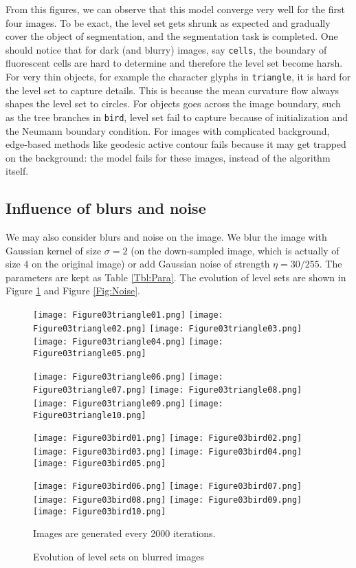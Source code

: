 \documentclass[english, nochinese]{pnote}
\begin{document}
From this figures, we can observe that this model converge very well for the first four images. To be exact, the level set gets shrunk as expected and gradually cover the object of segmentation, and the segmentation task is completed. One should notice that for dark (and blurry) images, say \verb"cells", the boundary of fluorescent cells are hard to determine and therefore the level set become harsh. For very thin objects, for example the character glyphs in \verb"triangle", it is hard for the level set to capture details. This is because the mean curvature flow always shapes the level set to circles. For objects goes across the image boundary, such as the tree branches in \verb"bird", level set fail to capture because of initialization and the Neumann boundary condition. For images with complicated background, edge-based methods like geodesic active contour fails because it may get trapped on the background: the model fails for these images, instead of the algorithm itself.

\subsection{Influence of blurs and noise}

We may also consider blurs and noise on the image. We blur the image with Gaussian kernel of size $ \sigma = 2 $ (on the down-sampled image, which is actually of size $4$ on the original image) or add Gaussian noise of strength $ \eta = 30 / 255 $. The parameters are kept as Table \ref{Tbl:Para}. The evolution of level sets are shown in Figure \ref{Fig:Blur} and Figure \ref{Fig:Noise}.

\begin{figure}[htbp]
{
\centering

\texttt{[image: Figure03triangle01.png]}
\texttt{[image: Figure03triangle02.png]}
\texttt{[image: Figure03triangle03.png]}
\texttt{[image: Figure03triangle04.png]}
\texttt{[image: Figure03triangle05.png]}

\texttt{[image: Figure03triangle06.png]}
\texttt{[image: Figure03triangle07.png]}
\texttt{[image: Figure03triangle08.png]}
\texttt{[image: Figure03triangle09.png]}
\texttt{[image: Figure03triangle10.png]}

\texttt{[image: Figure03bird01.png]}
\texttt{[image: Figure03bird02.png]}
\texttt{[image: Figure03bird03.png]}
\texttt{[image: Figure03bird04.png]}
\texttt{[image: Figure03bird05.png]}

\texttt{[image: Figure03bird06.png]}
\texttt{[image: Figure03bird07.png]}
\texttt{[image: Figure03bird08.png]}
\texttt{[image: Figure03bird09.png]}
\texttt{[image: Figure03bird10.png]}

\caption{Evolution of level sets on blurred images}
\label{Fig:Blur}
}
{
\footnotesize Images are generated every 2000 iterations.
}
\end{figure}
\end{document}
